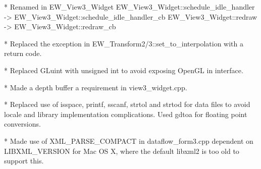 \begin{DoxyVerbInclude}
    * Renamed in EW_View3_Widget
        EW_View3_Widget::schedule_idle_handler ->
         EW_View3_Widget::schedule_idle_handler_cb
        EW_View3_Widget::redraw -> EW_View3_Widget::redraw_cb

    * Replaced the exception in EW_Transform2/3::set_to_interpolation with a
    return code.

    * Replaced GLuint with unsigned int to avoid exposing OpenGL in interface.

    * Made a depth buffer a requirement in view3_widget.cpp.

    * Replaced use of isspace, printf, sscanf, strtol and strtod for data files
    to avoid locale and library implementation complications.
    Used gdtoa for floating point conversions.

    * Made use of XML_PARSE_COMPACT in dataflow_form3.cpp dependent on
    LIBXML_VERSION for Mac OS X, where the default libxml2 is too old to
    support this.


\end{DoxyVerbInclude}
 